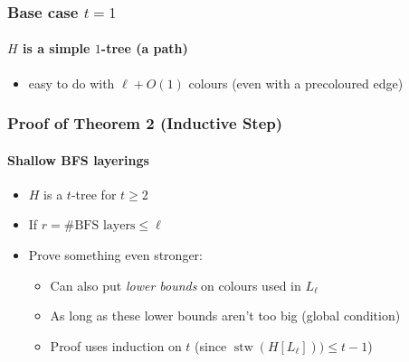 \documentclass[xcolor=dvipsnames]{beamer}
\DeclareMathOperator{\stw}{stw}
\begin{document}
\begin{frame}
  \frametitle{Base case $t=1$}
  \framesubtitle{$H$ is a simple $1$-tree (a path)}

  \begin{itemize}
    \item easy to do with $\ell+O(1)$ colours (even with a precoloured edge)
  \end{itemize}
  \begin{center}
  \end{center}
\end{frame}

\begin{frame}
  \frametitle{Proof of Theorem 2 (Inductive Step)}
  \framesubtitle{Shallow BFS layerings}

  \begin{itemize}
      \item $H$ is a $t$-tree for $t\ge 2$
      \item If $r=\text{\# BFS layers}\le \ell$
      \item<2->Prove something even stronger:
      \begin{itemize}
        \item Can also put \emph{lower bounds} on colours used in $L_\ell$
        \item As long as these lower bounds aren't too big (global condition)
        \item<3-> Proof uses induction on $t$ (since $\stw(H[L_\ell]))\le t-1$)
      \end{itemize}
  \end{itemize}
  \begin{center}
  \end{center}
\end{frame}
\end{document}
